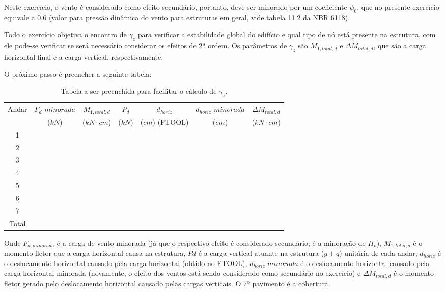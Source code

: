 
Neste exercício, o vento é considerado como efeito secundário, portanto, deve ser minorado por um coeficiente $\psi_0$, que no presente exercício equivale a 0,6 (valor para pressão dinâmica do vento para estruturas em geral, vide tabela 11.2 da NBR 6118).

Todo o exercício objetiva o encontro de $\gamma_z$ para verificar a estabilidade global do edifício e qual tipo de nó está presente na estrutura, com ele pode-se verificar se será necessário considerar os efeitos de 2ª ordem. Os parâmetros de $\gamma_z$ são $M_{1, total, d}$ e $\Delta M_{total, d}$, que são a carga horizontal final e a carga vertical, respectivamente.

O próximo passo é preencher a seguinte tabela:

\begin{table}[H]
\centering
\caption{Tabela a ser preenchida para facilitar o cálculo de $\gamma_z$.}
\label{tab:Tabela-exercicio-vento}
\begin{tabular}{c|c|c|ccc|c}
\hline
Andar & $F_d$ $minorada$ & $M_{1, total, d}$ & \multicolumn{1}{c|}{$P_d$} & \multicolumn{1}{c|}{$d_{horiz}$} & $d_{horiz}$ $minorada$ & $\Delta M_{total, d}$ \\
 & ($kN$) & ($kN\cdot cm$) & \multicolumn{1}{c|}{($kN$)} & \multicolumn{1}{c|}{($cm$) (FTOOL)} & ($cm$) & ($kN\cdot cm$) \\ \hline
1 &  &  & \multicolumn{1}{c|}{} & \multicolumn{1}{c|}{} &  &  \\
2 &  &  & \multicolumn{1}{c|}{} & \multicolumn{1}{c|}{} &  &  \\
3 &  &  & \multicolumn{1}{c|}{} & \multicolumn{1}{c|}{} &  &  \\
4 &  &  & \multicolumn{1}{c|}{} & \multicolumn{1}{c|}{} &  &  \\
5 &  &  & \multicolumn{1}{c|}{} & \multicolumn{1}{c|}{} &  &  \\
6 &  &  & \multicolumn{1}{c|}{} & \multicolumn{1}{c|}{} &  &  \\
7 &  &  & \multicolumn{1}{c|}{} & \multicolumn{1}{c|}{} &  &  \\ \hline
Total &  &  &  &  &  &  \\ \cline{1-1} \cline{3-3} \cline{7-7} 
\end{tabular}
\end{table}

Onde $F_{d, minorada}$ é a carga de vento minorada (já que o respectivo efeito é considerado secundário; é a minoração de $H_v$), $M_{1, total, d}$ é o momento fletor que a carga horizontal causa na estrutura, $Pd$ é a carga vertical atuante na estrutura ($g+q$) unitária de cada andar, $d_{horiz}$ é o deslocamento horizontal causado pela carga horizontal (obtido no FTOOL), $d_{horiz}\;minorada$ é o deslocamento horizontal causado pela carga horizontal minorada (novamente, o efeito dos ventos está sendo considerado como secundário no exercício) e $\Delta M_{total, d}$ é o momento fletor gerado pelo deslocamento horizontal causado pelas cargas verticais. O 7º pavimento é a cobertura.

